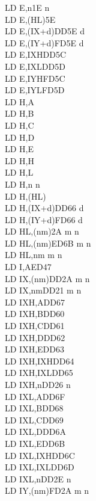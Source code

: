 \begin{multicols}{3}
{\begin{tabbing}
		LD E,n\>1E n\\
		LD E,(HL)\>5E\\
		LD E,(IX+d)\>DD5E d\\
		LD E,(IY+d)\>FD5E d\\
		LD E,IXH\UNDOC\>DD5C\\
		LD E,IXL\UNDOC\>DD5D\\
		LD E,IYH\UNDOC\>FD5C\\
		LD E,IYL\UNDOC\>FD5D\\
		LD H,A\\
		LD H,B\\
		LD H,C\\
		LD H,D\\
		LD H,E\\
		LD H,H\\
		LD H,L\\
		LD H,n n\\
		LD H,(HL)\\
		LD H,(IX+d)\>DD66 d\\
		LD H,(IY+d)\>FD66 d\\
		LD HL,(nm)\>2A m n\\
		LD HL,(nm)\>ED6B m n\\
		LD HL,nm m n\\
		LD I,A\>ED47\\
		LD IX,(nm)\>DD2A m n\\
		LD IX,nm\>DD21 m n\\
		LD IXH,A\UNDOC\>DD67\\
		LD IXH,B\UNDOC\>DD60\\
		LD IXH,C\UNDOC\>DD61\\
		LD IXH,D\UNDOC\>DD62\\
		LD IXH,E\UNDOC\>DD63\\
		LD IXH,IXH\UNDOC\>DD64\\
		LD IXH,IXL\UNDOC\>DD65\\
		LD IXH,n\UNDOC\>DD26 n \\
		LD IXL,A\UNDOC\>DD6F\\
		LD IXL,B\UNDOC\>DD68\\
		LD IXL,C\UNDOC\>DD69\\
		LD IXL,D\UNDOC\>DD6A\\
		LD IXL,E\UNDOC\>DD6B\\
		LD IXL,IXH\UNDOC\>DD6C\\
		LD IXL,IXL\UNDOC\>DD6D\\
		LD IXL,n\UNDOC\>DD2E n\\
		LD IY,(nm)\>FD2A m n\\

\end{tabbing}}
\end{multicols}
